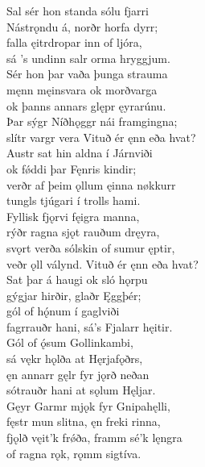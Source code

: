 \bva Sal sér hon standa \hld sólu fjarri \\%
Nástrǫndu á, \hld norðr horfa dyrr; \\%
falla ęitrdropar \hld inn of ljóra, \\%
sá ’s undinn salr \hld orma hryggjum.\\%

\bva Sér hon þar vaða \hld þunga strauma \\%
męnn męinsvara \hld ok morðvarga \\%
ok þanns annars glępr \hld ęyrarúnu. \\%
Þar sýgr Níðhǫggr \hld nái framgingna; \\%
slítr vargr vera \hld Vituð ér ęnn eða hvat?\\%

\bva Austr sat hin aldna \hld í Járnviði \\%
ok fǿddi þar \hld Fęnris kindir; \\%
verðr af þeim ǫllum \hld ęinna nøkkurr \\%
tungls tjúgari \hld í trolls hami.\\%

\bva Fyllisk fjǫrvi \hld fęigra manna, \\%
rýðr ragna sjǫt \hld rauðum dręyra, \\%
svǫrt verða sólskin \hld of sumur ęptir, \\%
veðr ǫll válynd. \hld Vituð ér ęnn eða hvat?\\%

\bva Sat þar á haugi \hld ok sló hǫrpu \\%
gýgjar hirðir, \hld glaðr Ęggþér; \\%
gól of hǫ́num \hld í gaglviði \\%
fagrrauðr hani, \hld sá's Fjalarr hęitir.\\%

\bva Gól of ǫ́sum \hld Gollinkambi, \\%
sá vękr hǫlða \hld at Hęrjafǫðrs, \\%
ęn annarr gęlr \hld fyr jǫrð neðan \\%
sótrauðr hani \hld at sǫlum Hęljar.\\%

\bva Gęyr Garmr mjǫk \hld fyr Gnipahęlli, \\%
fęstr mun slitna, \hld ęn freki rinna, \\%
fjǫlð vęit'k frǿða, \hld framm sé'k lęngra \\%
of ragna rǫk, \hld rǫmm sigtíva.\\%

